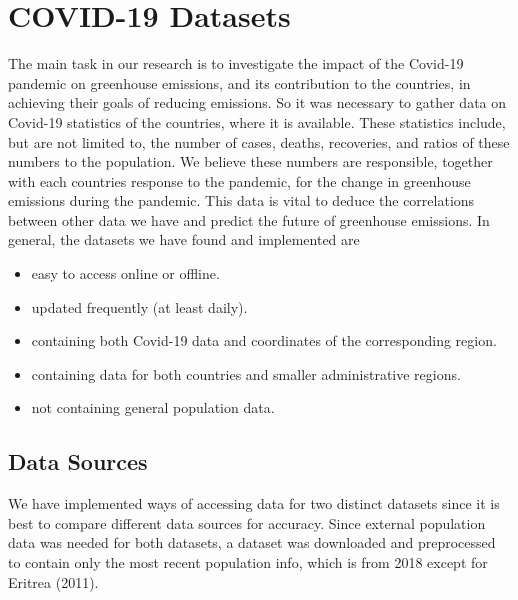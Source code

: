 \section{COVID-19 Datasets}







The main task in our research is to investigate the impact of the Covid-19 pandemic on greenhouse emissions, and its contribution to the countries, in achieving their goals of reducing emissions. So it was necessary to gather data on Covid-19 statistics of the countries, where it is available.
These statistics include, but are not limited to, the number of cases, deaths, recoveries, and ratios of these numbers to the population. We believe these numbers are responsible, together with each countries response to the pandemic, for the change in greenhouse emissions during the pandemic.
This data is vital to deduce the correlations between other data we have and predict the future of greenhouse emissions. In general, the datasets we have found and implemented are \begin{itemize}
	\item easy to access online or offline.
	\item updated frequently (at least daily).
	\item containing both Covid-19 data and coordinates of the corresponding region.
	\item containing data for both countries and smaller administrative regions.
	\item not containing general population data.
\end{itemize}

\subsection{Data Sources}
We have implemented ways of accessing data for two distinct datasets since it is best to compare different data sources for accuracy. Since external population data was needed for both datasets,
a dataset \cite{PopulationData} was downloaded and preprocessed to contain only the most recent population info, which is from 2018 except for Eritrea (2011).

